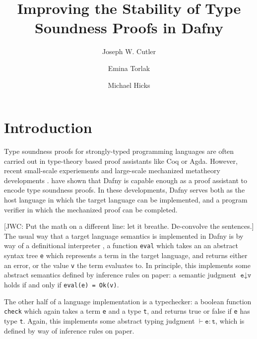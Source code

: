 \documentclass[sigplan,review,screen,anonymous]{acmart}
\author{Joseph W. Cutler}
\affiliation{%
  \institution{University of Pennsylvania}
  \city{Philadelphia}
  \state{Pennsylvania}
  \country{USA}
}
\author{Emina Torlak}
\affiliation{%
  \institution{Amazon Web Services}
  \city{Seattle}
  \state{Washington}
  \country{USA}
}
\author{Michael Hicks}
\affiliation{%
  \institution{Amazon Web Services}
  \city{Arlington}
  \state{Virginia}
  \country{USA}
}
\title{Improving the Stability of Type Soundness Proofs in Dafny}
\newcommand{\comm}[3]{\textcolor{#1}{[#2: #3]}}
\newcommand{\jwc}[1]{\comm{dkgreen}{JWC}{#1}}
\begin{document}
\maketitle

\section{Introduction}
Type soundness proofs for strongly-typed programming languages are often carried
out in type-theory based proof assistants like Coq or Agda. However, recent
small-scale experiements \cite{mayer-blog-post} and large-scale mechanized
metatheory developments \cite{cedar-dafny}.  have shown that Dafny is capable
enough as a proof assistant to encode type soundness proofs. In these
developments, Dafny serves both as the host language in which the target
language can be implemented, and a program verifier in which the mechanized
proof can be completed.

\jwc{Put the math on a different line: let it breathe. De-convolve the sentences.}
The usual way that a target language semantics is implemented in Dafny
is by way of a definitional interpreter \cite{definitional-interpreters}, a function \texttt{eval} which takes an
an abstract syntax tree \texttt{e} which represents a term in the target language, and returns either an error,
or the value \texttt{v} the term evaluates to. In principle, this implements some abstract semantics defined
by inference rules on paper: a semantic judgment $\texttt{e} \downarrow \texttt{v}$ holds if and only if \texttt{eval(e) = Ok(v)}.

The other half of a language implementation is a typechecker: a boolean function \texttt{check} which again takes a term \texttt{e}
and a type \texttt{t}, and returns true or false if \texttt{e} has type \texttt{t}. Again, this implements some abstract typing
judgment $\vdash \texttt{e} : \texttt{t}$, which is defined by way of inference rules on paper. 
\end{document}
